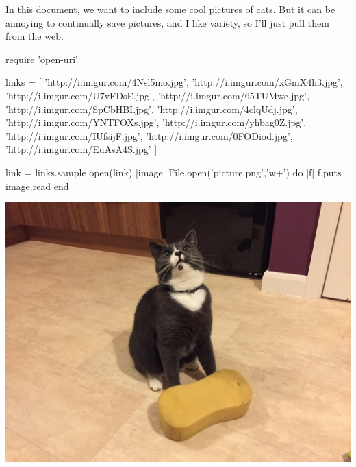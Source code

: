 \documentclass{hw}
\begin{document}
In this document, we want to include some cool pictures of cats. But it can be annoying to
continually save pictures, and I like variety, so I'll just pull them from the web.

\begin{rbtex}
require 'open-uri'

links = [
    'http://i.imgur.com/4Nsl5mo.jpg',
    'http://i.imgur.com/xGmX4h3.jpg',
    'http://i.imgur.com/U7vFDsE.jpg',
    'http://i.imgur.com/65TUMwc.jpg',
    'http://i.imgur.com/SpCbHBI.jpg',
    'http://i.imgur.com/4clqUdj.jpg',
    'http://i.imgur.com/YNTFOXs.jpg',
    'http://i.imgur.com/yhbag0Z.jpg',
    'http://i.imgur.com/IUfsijF.jpg',
    'http://i.imgur.com/0FODiod.jpg',
    'http://i.imgur.com/EuAsA4S.jpg'
]

link = links.sample
open(link) {|image|
    File.open('picture.png','w+') do |f|
        f.puts image.read
    end
}

\end{rbtex}
\begin{center}
\includegraphics[scale=0.4]{picture.png}
\end{center}
\end{document}
